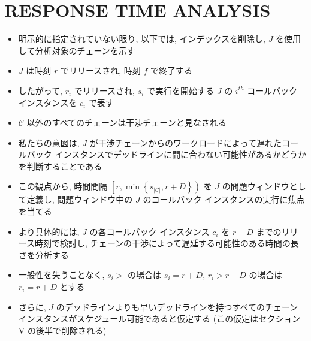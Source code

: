 

\section{RESPONSE TIME ANALYSIS}
\label{sec: responce_time_analysys}


\begin{frame}{}
    \begin{itemize}
        \item 明示的に指定されていない限り, 以下では, インデックスを削除し, $J$ を使用して分析対象のチェーンを示す
        \item $J$ は時刻 $r$ でリリースされ, 時刻 $f$ で終了する
        \item したがって, $r_{i}$ でリリースされ, $s_{i}$ で実行を開始する $J$ の $i^{t h}$ コールバック インスタンスを $c_{i}$ で表す
        \item $\mathcal{C}$ 以外のすべてのチェーンは干渉チェーンと見なされる
    \end{itemize}
\end{frame}

\begin{frame}{}
    \begin{itemize}
        \item 私たちの意図は, $J$ が干渉チェーンからのワークロードによって遅れたコールバック インスタンスでデッドラインに間に合わない可能性があるかどうかを判断することである
        \item この観点から, 時間間隔 $\left[r, \min \left\{s_{|\mathcal{C}|}, r+D\right\}\right)$ を $J$ の問題ウィンドウとして定義し, 問題ウィンドウ中の $J$ のコールバック インスタンスの実行に焦点を当てる
        \item より具体的には, $J$ の各コールバック インスタンス $c_{i}$ を $r+D$ までのリリース時刻で検討し, チェーンの干渉によって遅延する可能性のある時間の長さを分析する
    \end{itemize}
\end{frame}

\begin{frame}{}
    \begin{itemize}
        \item 一般性を失うことなく, $s_{i}>$ の場合は $s_{i}=r+D$, $r_{i}>r+D$ の場合は $r_{i}=r+D$ とする
        \item さらに,  $J$ のデッドラインよりも早いデッドラインを持つすべてのチェーン インスタンスがスケジュール可能であると仮定する (この仮定はセクション V の後半で削除される)
    \end{itemize}
\end{frame}

